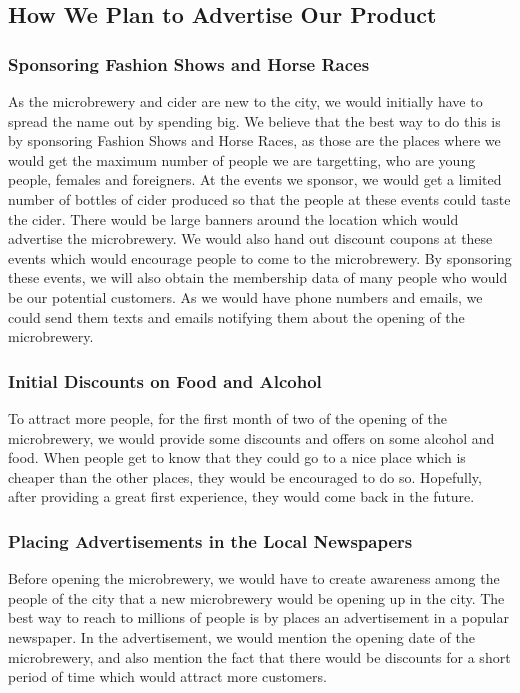 \documentclass{article}
\begin{document}
\subsection{How We Plan to Advertise Our Product}
\subsubsection{Sponsoring Fashion Shows and Horse Races}
As the microbrewery and cider are new to the city, we would initially have to 
spread the name out by spending big. We believe that the best way to do this is
by sponsoring Fashion Shows and Horse Races, as those are the places where we would
get the maximum number of people we are targetting, who are young people, females
and foreigners.
At the events we sponsor, we would get a limited number of bottles of cider produced
so that the people at these events could taste the cider. There would be large banners
around the location which would advertise the microbrewery. We would also hand out
discount coupons at these events which would encourage people to come to the 
microbrewery.
By sponsoring these events, we will also obtain the membership data of many
people who would be our potential customers. As we would have phone numbers and
emails, we could send them texts and emails notifying them about the opening of
the microbrewery.

\subsubsection{Initial Discounts on Food and Alcohol}
To attract more people, for the first month of two of the opening of the microbrewery,
we would provide some discounts and offers on some alcohol and food. When people
get to know that they could go to a nice place which is cheaper than the other
places, they would be encouraged to do so. Hopefully, after providing a great first
experience, they would come back in the future.

\subsubsection{Placing Advertisements in the Local Newspapers}
Before opening the microbrewery, we would have to create awareness among the
people of the city that a new microbrewery would be opening up in the city. The
best way to reach to millions of people is by places an advertisement in a popular
newspaper. In the advertisement, we would mention the opening date of the 
microbrewery, and also mention the fact that there would be discounts for a short
period of time which would attract more customers.
\end{document}
